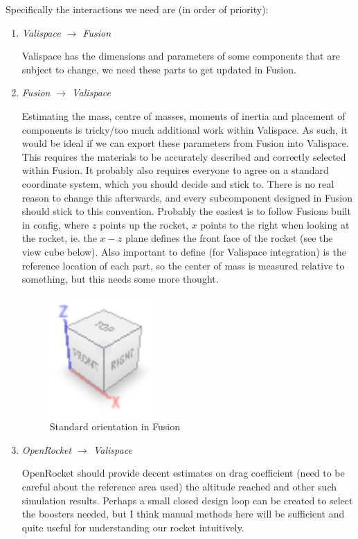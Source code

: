 \documentclass[12pt]{article}
\begin{document}
Specifically the interactions we need are (in order of priority):
\begin{enumerate}
\item \emph{Valispace $\rightarrow$ Fusion}

Valispace has the dimensions and parameters of some components that are subject to change, we need these parts to get updated in Fusion. 

\item \emph{ Fusion $\rightarrow$ Valispace}

Estimating the mass, centre of masses, moments of inertia and placement of components is tricky/too much additional work within Valispace. As such, it would be ideal if we can export these parameters from Fusion into Valispace. This requires the materials to be accurately described and correctly selected within Fusion.  It probably also requires everyone to agree on a standard coordinate system, which you should decide and stick to. There is no real reason to change this afterwards, and every subcomponent designed in Fusion should stick to this convention. Probably the easiest is to follow Fusions built in config, where $z$ points up the rocket, $x$ points to the right when looking at the rocket, ie. the $x-z$ plane defines the front face of the rocket (see the view cube below). Also important to define (for Valispace integration) is the reference location of each part, so the center of mass is measured relative to something, but this needs some more thought. 

\begin{figure}[htbp]
   \centering
   \includegraphics[width=0.2\linewidth]{view_cube.png}
   \caption{Standard orientation in Fusion}
   \label{fig:}
\end{figure}


\item \emph{ OpenRocket $\rightarrow$ Valispace}

OpenRocket should provide decent estimates on drag coefficient (need to be careful about the reference area used) the altitude reached and other such simulation results. Perhaps a small closed design loop can be created to select the boosters needed, but I think manual methods here will be sufficient and quite useful for understanding our rocket intuitively.  


\end{enumerate}
\end{document}
